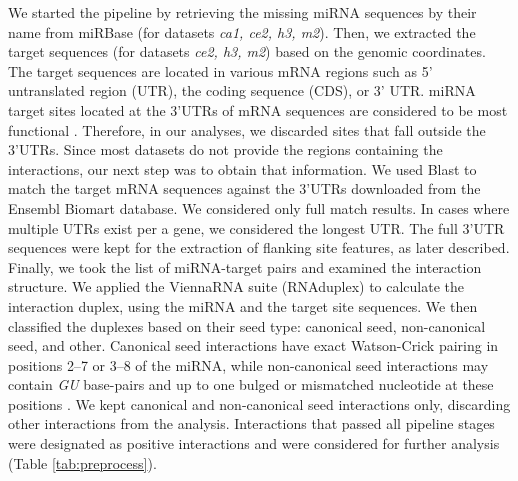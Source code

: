 \documentclass{bmcart}
\begin{document}
We started the pipeline by retrieving the missing miRNA sequences by their name from miRBase (for datasets  \textit{ca1, ce2, h3, m2}). Then, we extracted the target sequences (for datasets \textit{ce2, h3, m2}) based on the genomic coordinates. The target sequences are located in various mRNA regions such as 5’ untranslated region (UTR), the coding sequence (CDS), or 3’ UTR. miRNA target sites located at the 3’UTRs of mRNA sequences are considered to be most functional \cite{menor2014mirmark, baek2008impact}. Therefore, in our analyses, we discarded sites that fall outside the 3’UTRs. Since most datasets do not provide the regions containing the interactions, our next step was to obtain that information. We used Blast \cite{altschul1990basic_blast} to match the target mRNA sequences against the 3'UTRs downloaded from the Ensembl Biomart database. We considered only full match results. In cases where multiple UTRs exist per a gene, we considered the longest UTR. The full 3'UTR sequences were kept for the extraction of flanking site features, as later described. Finally, we took the list of miRNA-target pairs and examined the interaction structure. We applied the ViennaRNA suite (RNAduplex) \cite{lorenz2011viennarna} to calculate the interaction duplex, using the miRNA and the target site sequences. We then classified the duplexes based on their seed type: canonical seed, non-canonical seed, and other. Canonical seed interactions have exact Watson-Crick pairing in positions 2–7 or 3–8 of the miRNA, while non-canonical seed interactions may contain \textit{GU} base-pairs and up to one bulged or mismatched nucleotide at these positions \cite{helwak2013mapping}. We kept canonical and non-canonical seed interactions only, discarding other interactions from the analysis.
Interactions that passed all pipeline stages were designated as positive interactions and were considered for further analysis (Table \ref{tab:preprocess}).
\end{document}
